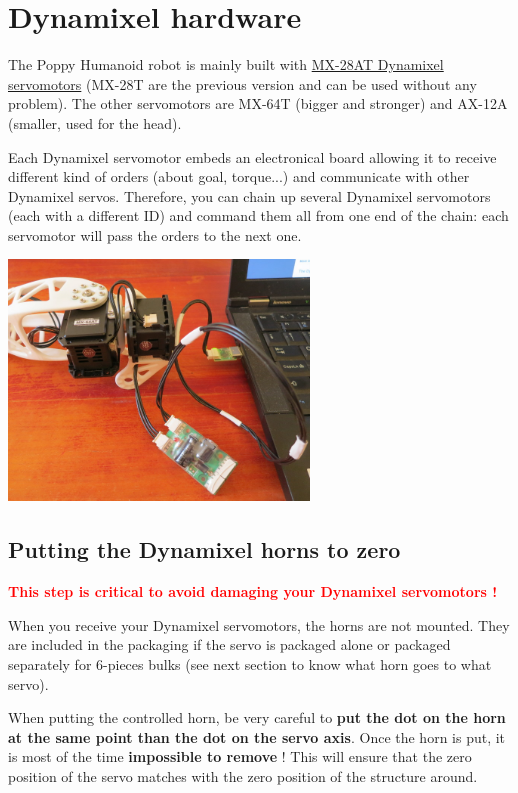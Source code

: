 \documentclass{article}
\begin{document}
\section{Dynamixel hardware}

The Poppy Humanoid robot is mainly built with \href{http://www.generationrobots.com/en/401858-servomotor-dynamixel-mx-28at.html}{MX-28AT Dynamixel servomotors} (MX-28T are the previous version and can be used without any problem). The other servomotors are MX-64T (bigger and stronger) and AX-12A (smaller, used for the head).

Each Dynamixel servomotor embeds an electronical board allowing it to receive different kind of orders (about goal, torque...) and communicate with other Dynamixel servos. Therefore, you can chain up several Dynamixel servomotors (each with a different ID) and command them all from one end of the chain: each servomotor will pass the orders to the next one. 

 \begin{center}
  \includegraphics[width=0.6\textwidth]{img/daisy_link}
 \end{center}
 

\subsection{Putting the Dynamixel horns to zero}
\label{dynamixel-zero}

\textcolor{red}{\textbf{This step is critical to avoid damaging your Dynamixel servomotors !}}

When you receive your Dynamixel servomotors, the horns are not mounted. They are included in the packaging if the servo is packaged alone or packaged separately for 6-pieces bulks (see next section to know what horn goes to what servo).

When putting the controlled horn, be very careful to \textbf{put the dot on the horn at the same point than the dot on the servo axis}. Once the horn is put, it is most of the time \textbf{impossible to remove} ! This will ensure that the zero position of the servo matches with the zero position of the structure around.
\end{document}
